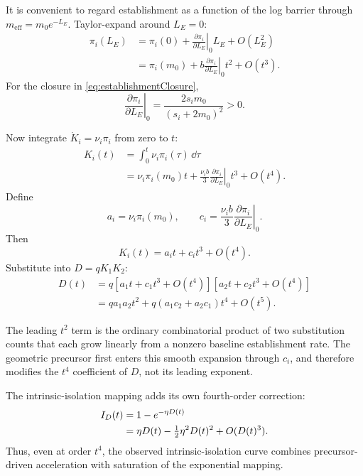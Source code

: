 It is convenient to regard establishment as a function of the log barrier through \(m_{\mathrm{eff}}=m_0e^{-L_E}\). Taylor-expand around \(L_E=0\):
\begin{align}
\pi_i(L_E)
&=\pi_i(0)
+\left.\frac{\partial\pi_i}{\partial L_E}\right|_0L_E
+O(L_E^2)\\
&=\pi_i(m_0)
+b\left.\frac{\partial\pi_i}{\partial L_E}\right|_0t^2
+O(t^3).
\label{eq:earlyEstablishmentExpansion}
\end{align}
For the closure in \cref{eq:establishmentClosure},
\begin{equation}
\left.\frac{\partial\pi_i}{\partial L_E}\right|_0
=\frac{2s_im_0}{(s_i+2m_0)^2}>0.
\end{equation}

Now integrate \(\dot K_i=\nu_i\pi_i\) from zero to \(t\):
\begin{align}
K_i(t)
&=\int_0^t\nu_i\pi_i(\tau)\,\dd\tau\\
&=\nu_i\pi_i(m_0)t
+\frac{\nu_i b}{3}
\left.\frac{\partial\pi_i}{\partial L_E}\right|_0t^3
+O(t^4).
\label{eq:earlySubstitutionExpansion}
\end{align}
Define
\begin{equation}
a_i=\nu_i\pi_i(m_0),
\qquad
c_i=\frac{\nu_i b}{3}
\left.\frac{\partial\pi_i}{\partial L_E}\right|_0.
\end{equation}
Then
\begin{equation}
K_i(t)=a_it+c_it^3+O(t^4).
\end{equation}
Substitute into \(D=qK_1K_2\):
\begin{align}
D(t)
&=q\left[a_1t+c_1t^3+O(t^4)\right]
\left[a_2t+c_2t^3+O(t^4)\right]\\
&=\boxed{
q a_1a_2t^2
+q(a_1c_2+a_2c_1)t^4
+O(t^5).}
\label{eq:earlyDMIExpansion}
\end{align}

\begin{mathteach}
The leading \(t^2\) term is the ordinary combinatorial product of two substitution counts that each grow linearly from a nonzero baseline establishment rate. The geometric precursor first enters this smooth expansion through \(c_i\), and therefore modifies the \(t^4\) coefficient of \(D\), not its leading exponent.
\end{mathteach}

The intrinsic-isolation mapping adds its own fourth-order correction:
\begin{align}
I_D(t)
&=1-e^{-\eta D(t)}\\
&=\eta D(t)-\tfrac12\eta^2D(t)^2+O(D(t)^3).
\end{align}
Thus, even at order \(t^4\), the observed intrinsic-isolation curve combines precursor-driven acceleration with saturation of the exponential mapping.

